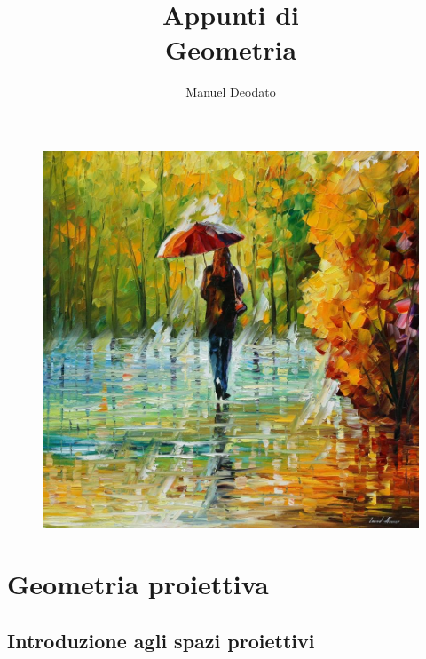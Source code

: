 \documentclass[11pt]{scrartcl}
\title{Appunti di\\ \vspace{.3cm} Geometria}
\author{Manuel Deodato}
\date{}
\theoremstyle{style1}
\renewcommand{\maketitle}{
\begin{center}
{\sffamily
{\fontsize{20}{20}\selectfont\MakeUppercase\thetitle}}

\vspace{0.2in}

{\large\scshape\sffamily\theauthor}
\end{center}
}
\numberwithin{equation}{subsection}
\begin{document}
\maketitle
\vspace{9cm}
\begin{figure}[h!]
	\centering
	\includegraphics[width=.7\columnwidth]{front1.jpeg}
\end{figure}

\newpage
\tableofcontents 
\newpage
\section{Geometria proiettiva}

\subsection{Introduzione agli spazi proiettivi}
\end{document}
